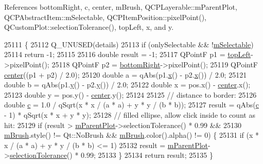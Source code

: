 References bottom\+Right, c, center, m\+Brush, Q\+C\+P\+Layerable\+::m\+Parent\+Plot, Q\+C\+P\+Abstract\+Item\+::m\+Selectable, Q\+C\+P\+Item\+Position\+::pixel\+Point(), Q\+Custom\+Plot\+::selection\+Tolerance(), top\+Left, x, and y.


\begin{DoxyCode}
25111                                                            \{
25112   Q\_UNUSED(details)
25113   if (onlySelectable && !\hyperlink{class_q_c_p_abstract_item_ad81eb35c8726a0f458db9df9732e0e41}{mSelectable})
25114     return -1;
25115 
25116   \textcolor{keywordtype}{double} result = -1;
25117   QPointF p1 = \hyperlink{class_q_c_p_item_ellipse_a12fd8420c06718d0c8a2303d6a652848}{topLeft}->pixelPoint();
25118   QPointF p2 = \hyperlink{class_q_c_p_item_ellipse_ab73c8deafc0d8d1ef7d75b6cdcc37159}{bottomRight}->pixelPoint();
25119   QPointF \hyperlink{class_q_c_p_item_ellipse_a8b6dd0e854f99239c5806ffdf2f590b3}{center}((p1 + p2) / 2.0);
25120   \textcolor{keywordtype}{double} a = qAbs(p1.\hyperlink{_comparision_pictures_2_createtest_image_8m_a9336ebf25087d91c818ee6e9ec29f8c1}{x}() - p2.\hyperlink{_comparision_pictures_2_createtest_image_8m_a9336ebf25087d91c818ee6e9ec29f8c1}{x}()) / 2.0;
25121   \textcolor{keywordtype}{double} b = qAbs(p1.\hyperlink{_comparision_pictures_2_createtest_image_8m_a2fb1c5cf58867b5bbc9a1b145a86f3a0}{y}() - p2.\hyperlink{_comparision_pictures_2_createtest_image_8m_a2fb1c5cf58867b5bbc9a1b145a86f3a0}{y}()) / 2.0;
25122   \textcolor{keywordtype}{double} x = pos.x() - \hyperlink{class_q_c_p_item_ellipse_a8b6dd0e854f99239c5806ffdf2f590b3}{center}.x();
25123   \textcolor{keywordtype}{double} y = pos.y() - \hyperlink{class_q_c_p_item_ellipse_a8b6dd0e854f99239c5806ffdf2f590b3}{center}.y();
25124 
25125   \textcolor{comment}{// distance to border:}
25126   \textcolor{keywordtype}{double} \hyperlink{_comparision_pictures_2_createtest_image_8m_ae0323a9039add2978bf5b49550572c7c}{c} = 1.0 / qSqrt(x * x / (a * a) + y * y / (b * b));
25127   result = qAbs(\hyperlink{_comparision_pictures_2_createtest_image_8m_ae0323a9039add2978bf5b49550572c7c}{c} - 1) * qSqrt(x * x + y * y);
25128   \textcolor{comment}{// filled ellipse, allow click inside to count as hit:}
25129   if (result > \hyperlink{class_q_c_p_layerable_aa2a528433e44db02b8aef23c1f9f90ed}{mParentPlot}->selectionTolerance() * 0.99 &&
25130       \hyperlink{class_q_c_p_item_ellipse_a6fa59478cd3ad1b10e6c1f6cedc84bd6}{mBrush}.style() != Qt::NoBrush && \hyperlink{class_q_c_p_item_ellipse_a6fa59478cd3ad1b10e6c1f6cedc84bd6}{mBrush}.color().alpha() != 0) \{
25131     \textcolor{keywordflow}{if} (x * x / (a * a) + y * y / (b * b) <= 1)
25132       result = \hyperlink{class_q_c_p_layerable_aa2a528433e44db02b8aef23c1f9f90ed}{mParentPlot}->\hyperlink{class_q_custom_plot_a7b738074c75e80070ef6a10263c6cd69}{selectionTolerance}() * 0.99;
25133   \}
25134   \textcolor{keywordflow}{return} result;
25135 \}
\end{DoxyCode}


